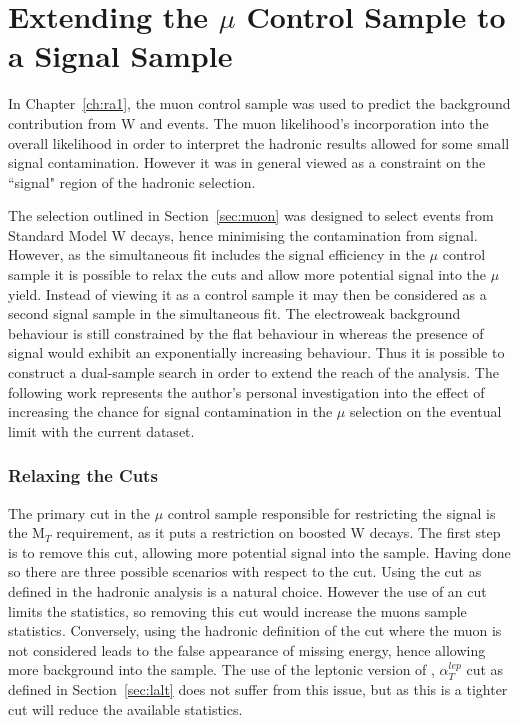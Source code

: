 \chapter{Extending the $\mu$ Control Sample to a Signal Sample}
\label{ch:ra4}

In Chapter~\ref{ch:ra1}, the muon control sample was used to predict the background contribution from W and \tto events. The muon likelihood's incorporation into the overall likelihood in order to interpret the hadronic results allowed for some small signal contamination. However it was in general viewed as a constraint on the ``signal" region of the hadronic selection. 

The selection outlined in Section~\ref{sec:muon} was designed to select events from Standard Model W decays, hence minimising the contamination from signal. However, as the simultaneous fit includes the signal efficiency in the $\mu$ control sample it is possible to relax the cuts and allow more potential signal into the $\mu$ yield. Instead of viewing it as a control sample it may then be considered as a second signal sample in the simultaneous fit. The electroweak background behaviour is still constrained by the flat behaviour in \RaT whereas the presence of signal would exhibit an exponentially increasing behaviour. Thus it is possible to construct a dual-sample search in order to extend the reach of the analysis.  The following work represents the author's personal investigation into the effect of increasing the chance for signal contamination in the $\mu$ selection on the eventual limit with the current dataset. 

\subsection{Relaxing the Cuts}

The primary cut in the $\mu$ control sample responsible for restricting the signal is the M$_{T}$ requirement, as it puts a restriction on boosted W decays. The first step is to remove this cut, allowing more potential signal into the sample. Having done so there are three possible scenarios with respect to the \alt cut. Using the \alt cut as defined in the hadronic analysis is a natural choice. However the use of an \alt cut limits the statistics, so removing this cut would increase the muons sample statistics. Conversely, using the hadronic definition of the \alt cut where the muon is not considered leads to the false appearance of missing energy, hence allowing more background into the sample. The use of the leptonic version of \alt, $\alpha^{lep}_{T}$ cut as defined in Section~\ref{sec:lalt} does not suffer from this issue, but as this is a tighter cut will reduce the available statistics. 

